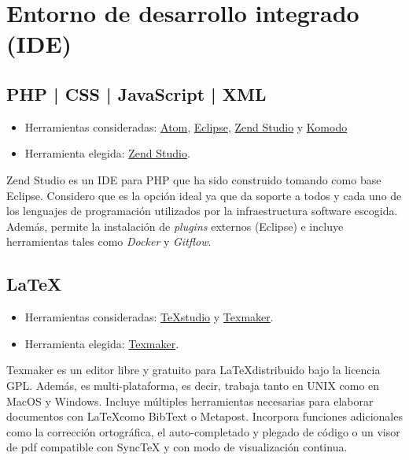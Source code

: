 \section{Entorno de desarrollo integrado (IDE)}\label{ide}

\subsection{PHP | CSS | JavaScript | XML}\label{java}

\begin{itemize}
\tightlist
	\item Herramientas consideradas:
  		\href{https://atom.io/}{Atom},
  		\href{https://eclipse.org/}{Eclipse},
  		\href{https://www.zend.com/products/zend-studio}{Zend Studio} y
  		\href{https://www.activestate.com/products/komodo-ide/}{Komodo}  
	\item Herramienta elegida: \href{https://www.zend.com/products/zend-studio}{Zend Studio}.
\end{itemize}

Zend Studio es un IDE para PHP que ha sido construido tomando como base Eclipse. Considero que es la opción ideal ya que da soporte a todos y cada uno de los lenguajes de programación utilizados por la infraestructura software escogida. Además, permite la instalación de \emph{plugins} externos (Eclipse) e incluye herramientas tales como \emph{Docker} y \emph{Gitflow}. 

\subsection{LaTeX}\label{latex}

\begin{itemize}
\tightlist
	\item Herramientas consideradas:
  		\href{https://www.texstudio.org/}{TeXstudio} y
  		\href{http://www.xm1math.net/texmaker/}{Texmaker}.
	\item Herramienta elegida:
  		\href{http://www.xm1math.net/texmaker/}{Texmaker}.
\end{itemize}

Texmaker es un editor libre y gratuito para \LaTeX distribuido bajo la licencia GPL. Además, es multi-plataforma, es decir, trabaja tanto en UNIX como en MacOS y Windows. Incluye múltiples herramientas necesarias para elaborar documentos con \LaTeX como BibText o Metapost. Incorpora funciones adicionales como la corrección ortográfica, el auto-completado y plegado de código o un visor de pdf compatible con SyncTeX y con modo de visualización continua. 

